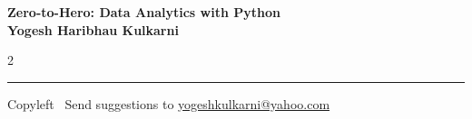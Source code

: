 \documentclass[8pt,landscape]{article}
\begin{document}
\footnotesize


\begin{center}
\Large{\textbf{Zero-to-Hero: Data Analytics with Python\\ Yogesh Haribhau Kulkarni}}  
\end{center}

\begin{multicols}{2}

\end{multicols}

\rule{\linewidth}{0.25pt}
\scriptsize
Copyleft \textcopyleft\  Send suggestions to 
\href{http://www.yogeshkulkarni.com}{yogeshkulkarni@yahoo.com}
\end{document}
